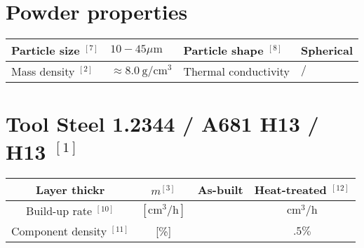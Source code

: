 \documentclass[10pt]{article}
\begin{document}
\section*{Powder properties}
\begin{center}
\begin{tabular}{|l|l|l|l|}
\hline
Particle size ${ }^{[7]}$ & $10-45 \mu \mathrm{m}$ & Particle shape ${ }^{[8]}$ & Spherical \\
\hline
Mass density ${ }^{[2]}$ & $\approx 8.0 \mathrm{~g} / \mathrm{cm}^{3}$ & Thermal conductivity & $/$ \\
\hline
\end{tabular}
\end{center}

\section*{Tool Steel 1.2344 / A681 H13 / H13 ${ }^{[1]}$}
\begin{center}
\begin{tabular}{|c|c|c|c|}
\hline
Layer thickr & $m^{[3]}$ & As-built & Heat-treated ${ }^{[12]}$ \\
\hline
Build-up rate ${ }^{[10]}$ & $\left[\mathrm{cm}^{3} / \mathrm{h}\right]$ &  & $\mathrm{cm}^{3} / \mathrm{h}$ \\
\hline
Component density ${ }^{[11]}$ & [\%] &  & $.5 \%$ \\
\hline
\end{tabular}
\end{center}
\end{document}
